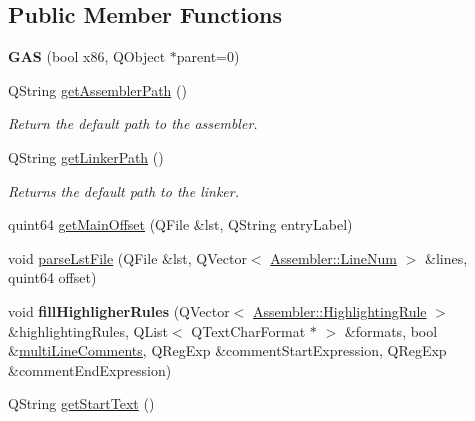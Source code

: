 \subsection*{Public Member Functions}
\begin{DoxyCompactItemize}
\item 
\hypertarget{class_g_a_s_af13f9f492a83b6a8d13607e2dbc08726}{}{\bfseries G\+A\+S} (bool x86, Q\+Object $\ast$parent=0)\label{class_g_a_s_af13f9f492a83b6a8d13607e2dbc08726}

\item 
\hypertarget{class_g_a_s_adc206282c20b7a3f69b40c294883c1f0}{}Q\+String \hyperlink{class_g_a_s_adc206282c20b7a3f69b40c294883c1f0}{get\+Assembler\+Path} ()\label{class_g_a_s_adc206282c20b7a3f69b40c294883c1f0}

\begin{DoxyCompactList}\small\item\em Return the default path to the assembler. \end{DoxyCompactList}\item 
\hypertarget{class_g_a_s_a21833928db55133bad977fca971fad3a}{}Q\+String \hyperlink{class_g_a_s_a21833928db55133bad977fca971fad3a}{get\+Linker\+Path} ()\label{class_g_a_s_a21833928db55133bad977fca971fad3a}

\begin{DoxyCompactList}\small\item\em Returns the default path to the linker. \end{DoxyCompactList}\item 
quint64 \hyperlink{class_g_a_s_ab1d4e22ffd3a438afa4dad4025ab2735}{get\+Main\+Offset} (Q\+File \&lst, Q\+String entry\+Label)
\item 
void \hyperlink{class_g_a_s_a572e0d7058f6f5d65a90c77a8b727460}{parse\+Lst\+File} (Q\+File \&lst, Q\+Vector$<$ \hyperlink{struct_assembler_1_1_line_num}{Assembler\+::\+Line\+Num} $>$ \&lines, quint64 offset)
\item 
\hypertarget{class_g_a_s_a50f67e9e0a7a5d235397bee4cc05a2a0}{}void {\bfseries fill\+Highligher\+Rules} (Q\+Vector$<$ \hyperlink{struct_assembler_1_1_highlighting_rule}{Assembler\+::\+Highlighting\+Rule} $>$ \&highlighting\+Rules, Q\+List$<$ Q\+Text\+Char\+Format $\ast$ $>$ \&formats, bool \&\hyperlink{class_assembler_a8e2ae531c6d59dfea8c7bb90febda262}{multi\+Line\+Comments}, Q\+Reg\+Exp \&comment\+Start\+Expression, Q\+Reg\+Exp \&comment\+End\+Expression)\label{class_g_a_s_a50f67e9e0a7a5d235397bee4cc05a2a0}

\item 
\hypertarget{class_g_a_s_aeb1894b36402e608ac97ce73547f51bd}{}Q\+String \hyperlink{class_g_a_s_aeb1894b36402e608ac97ce73547f51bd}{get\+Start\+Text} ()\label{class_g_a_s_aeb1894b36402e608ac97ce73547f51bd}


\end{DoxyCompactItemize}
